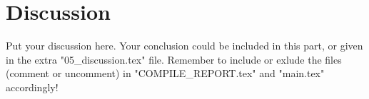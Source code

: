 \section{Discussion} \label{sec:discussion}

Put your discussion here. Your conclusion could be included in this part, or given in the extra "05\_discussion.tex" file. Remember to include or exlude the files (comment or uncomment) in "COMPILE\_REPORT.tex" and "main.tex" accordingly!